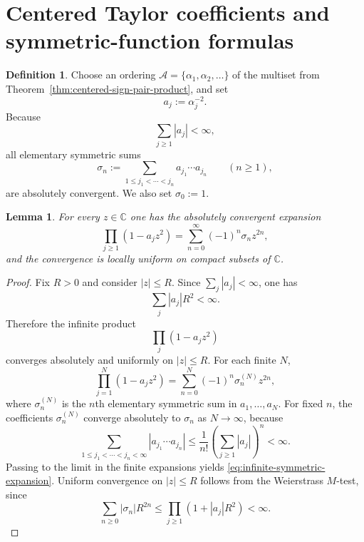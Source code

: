 \documentclass[11pt,a4paper]{article}
\numberwithin{equation}{section}
\newtheorem{lemma}[theorem]{Lemma}
\theoremstyle{definition}
\newtheorem{definition}[theorem]{Definition}
\theoremstyle{remark}
\newcommand{\CC}{\mathbb C}
\begin{document}
\section{Centered Taylor coefficients and symmetric-function formulas}

\begin{definition}
Choose an ordering $\mathcal A=\{\alpha_1,\alpha_2,\dots\}$ of the multiset from Theorem~\ref{thm:centered-sign-pair-product}, and set
\[
a_j:=\alpha_j^{-2}.
\]
Because
\[
\sum_{j\ge 1}|a_j|<\infty,
\]
all elementary symmetric sums
\begin{equation}\label{eq:elementary-symmetric-def}
\sigma_n:=\sum_{1\le j_1<\cdots<j_n} a_{j_1}\cdots a_{j_n}
\qquad (n\ge 1),
\end{equation}
are absolutely convergent.  We also set $\sigma_0:=1$.
\end{definition}

\begin{lemma}\label{lem:infinite-symmetric-expansion}
For every $z\in\CC$ one has the absolutely convergent expansion
\begin{equation}\label{eq:infinite-symmetric-expansion}
\prod_{j\ge 1}(1-a_j z^2)=\sum_{n=0}^{\infty}(-1)^n\sigma_n z^{2n},
\end{equation}
and the convergence is locally uniform on compact subsets of $\CC$.
\end{lemma}

\begin{proof}
Fix $R>0$ and consider $|z|\le R$.  Since $\sum_j |a_j|<\infty$, one has
\[
\sum_j |a_j|R^2<\infty.
\]
Therefore the infinite product
\[
\prod_j (1-a_j z^2)
\]
converges absolutely and uniformly on $|z|\le R$.  For each finite $N$,
\[
\prod_{j=1}^N(1-a_j z^2)=\sum_{n=0}^{N}(-1)^n\sigma_n^{(N)} z^{2n},
\]
where $\sigma_n^{(N)}$ is the $n$th elementary symmetric sum in $a_1,\dots,a_N$.  For fixed $n$, the coefficients $\sigma_n^{(N)}$ converge absolutely to $\sigma_n$ as $N\to\infty$, because
\[
\sum_{1\le j_1<\cdots<j_n<\infty}|a_{j_1}\cdots a_{j_n}|
\le \frac{1}{n!}\left(\sum_{j\ge 1}|a_j|\right)^n<\infty.
\]
Passing to the limit in the finite expansions yields \eqref{eq:infinite-symmetric-expansion}.  Uniform convergence on $|z|\le R$ follows from the Weierstrass $M$-test, since
\[
\sum_{n\ge 0}|\sigma_n|R^{2n}\le \prod_{j\ge 1}(1+|a_j|R^2)<\infty.
\]
\end{proof}
\end{document}
